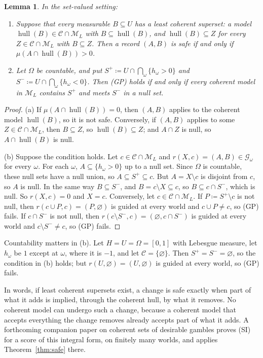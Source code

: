 \documentclass[11pt]{article}
\newtheorem{lemma}[theorem]{Lemma}
\theoremstyle{definition}
\theoremstyle{remark}
\newcommand{\M}{\mathcal M}
\newcommand{\C}{\mathcal C}
\newcommand{\G}{\mathcal G}
\newcommand{\hull}{\operatorname{hull}}
\begin{document}
\begin{lemma}\label{lem:hull-test}
In the set-valued setting:
\begin{enumerate}[label=(\alph*)]
\item Suppose that every measurable $B\subseteq U$ has a least coherent superset: a model $\hull(B)\in\C\cap\M_L$ with $B\subseteq\hull(B)$, and $\hull(B)\subseteq Z$ for every $Z\in\C\cap\M_L$ with $B\subseteq Z$. Then a record $(A,B)$ is safe if and only if $\mu(A\cap\hull(B))>0$.
\item Let $\Omega$ be countable, and put $S^+\coloneqq U\cap\bigcap_\omega\{h_\omega>0\}$ and $S^-\coloneqq U\cap\bigcap_\omega\{h_\omega<0\}$. Then (GP) holds if and only if every coherent model in $\M_L$ contains $S^+$ and meets $S^-$ in a null set.
\end{enumerate}
\end{lemma}
\begin{proof}
(a) If $\mu(A\cap\hull(B))=0$, then $(A,B)$ applies to the coherent model $\hull(B)$, so it is not safe. Conversely, if $(A,B)$ applies to some $Z\in\C\cap\M_L$, then $B\subseteq Z$, so $\hull(B)\subseteq Z$; and $A\cap Z$ is null, so $A\cap\hull(B)$ is null.

(b) Suppose the condition holds. Let $c\in\C\cap\M_L$ and $r(X,c)=(A,B)\in\G_\omega$ for every $\omega$. For each $\omega$, $A\subseteq\{h_\omega>0\}$ up to a null set. Since $\Omega$ is countable, these null sets have a null union, so $A\subseteq S^+\subseteq c$. But $A=X\setminus c$ is disjoint from $c$, so $A$ is null. In the same way $B\subseteq S^-$, and $B=c\setminus X\subseteq c$, so $B\subseteq c\cap S^-$, which is null. So $r(X,c)=0$ and $X=c$. Conversely, let $c\in\C\cap\M_L$. If $P\coloneqq S^+\setminus c$ is not null, then $r(c\cup P,c)=(P,\varnothing)$ is guided at every world and $c\cup P\ne c$, so (GP) fails. If $c\cap S^-$ is not null, then $r(c\setminus S^-,c)=(\varnothing,c\cap S^-)$ is guided at every world and $c\setminus S^-\neq c$, so (GP) fails.
\end{proof}
Countability matters in (b). Let $H=U=\Omega=[0,1]$ with Lebesgue measure, let $h_\omega$ be $1$ except at $\omega$, where it is $-1$, and let $\C=\{\varnothing\}$. Then $S^+=S^-=\varnothing$, so the condition in (b) holds; but $r(U,\varnothing)=(U,\varnothing)$ is guided at every world, so (GP) fails.

In words, if least coherent supersets exist, a change is safe exactly when part of what it adds is implied, through the coherent hull, by what it removes. No coherent model can undergo such a change, because a coherent model that accepts everything the change removes already accepts part of what it adds. A forthcoming companion paper on coherent sets of desirable gambles proves (SI) for a score of this integral form, on finitely many worlds, and applies Theorem~\ref{thm:safe} there.
\end{document}
